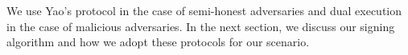 We use Yao's protocol in the case of semi-honest adversaries and dual execution in the case of malicious adversaries. In the next section, we discuss our signing algorithm and how we adopt these protocols for our scenario.
%  

